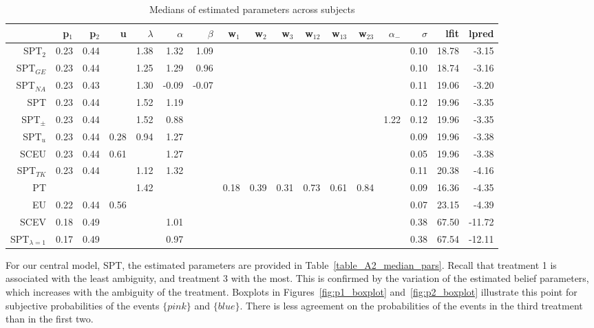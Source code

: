 \documentclass[11pt, a4paper, oneside,final,notitlepage,onecolumn]{article}\usepackage[]{graphicx}\usepackage[]{color}
\begin{document}
\begin{table}[!htb]
\centering
\begin{tabular}{rrrrrrrrrrrrrrrrr}
  \hline
 & p$_{1}$ & p$_{2}$ & u & $\lambda$ & $\alpha$ & $\beta$ & w$_{1}$ & w$_{2}$ & w$_{3}$ & w$_{12}$ & w$_{13}$ & w$_{23}$ & $\alpha_{-}$ & $\sigma$ & lfit & lpred \\ 
  \hline
SPT$_{2}$ & 0.23 & 0.44 &  & 1.38 & 1.32 & 1.09 &  &  &  &  &  &  &  & 0.10 & 18.78 & -3.15 \\ 
  SPT$_{GE}$ & 0.23 & 0.44 &  & 1.25 & 1.29 & 0.96 &  &  &  &  &  &  &  & 0.10 & 18.74 & -3.16 \\ 
  SPT$_{NA}$ & 0.23 & 0.43 &  & 1.30 & -0.09 & -0.07 &  &  &  &  &  &  &  & 0.11 & 19.06 & -3.20 \\ 
  SPT & 0.23 & 0.44 &  & 1.52 & 1.19 &  &  &  &  &  &  &  &  & 0.12 & 19.96 & -3.35 \\ 
  SPT$_{\pm}$ & 0.23 & 0.44 &  & 1.52 & 0.88 &  &  &  &  &  &  &  & 1.22 & 0.12 & 19.96 & -3.35 \\ 
  SPT$_{u}$ & 0.23 & 0.44 & 0.28 & 0.94 & 1.27 &  &  &  &  &  &  &  &  & 0.09 & 19.96 & -3.38 \\ 
  SCEU & 0.23 & 0.44 & 0.61 &  & 1.27 &  &  &  &  &  &  &  &  & 0.05 & 19.96 & -3.38 \\ 
  SPT$_{TK}$ & 0.23 & 0.44 &  & 1.12 & 1.32 &  &  &  &  &  &  &  &  & 0.11 & 20.38 & -4.16 \\ 
  PT &  &  &  & 1.42 &  &  & 0.18 & 0.39 & 0.31 & 0.73 & 0.61 & 0.84 &  & 0.09 & 16.36 & -4.35 \\ 
  EU & 0.22 & 0.44 & 0.56 &  &  &  &  &  &  &  &  &  &  & 0.07 & 23.15 & -4.39 \\ 
  SCEV & 0.18 & 0.49 &  &  & 1.01 &  &  &  &  &  &  &  &  & 0.38 & 67.50 & -11.72 \\ 
  SPT$_{\lambda = 1}$ & 0.17 & 0.49 &  &  & 0.97 &  &  &  &  &  &  &  &  & 0.38 & 67.54 & -12.11 \\ 
   \hline
\end{tabular}
\caption{Medians of estimated parameters across subjects} 
\label{table_A1_median_pars}
\end{table}



For our central model, SPT, the estimated parameters are provided in Table~\ref{table_A2_median_pars}. Recall that treatment 1 is associated with the least ambiguity, and treatment 3 with the most. This is confirmed by the variation of the estimated belief parameters, which increases with the ambiguity of the treatment. Boxplots in Figures~\ref{fig:p1_boxplot} and~\ref{fig:p2_boxplot} illustrate this point for subjective probabilities of the events $\{pink\}$ and $\{blue\}$. There is less agreement on the probabilities of the events in the third treatment than in the first two.
\end{document}
